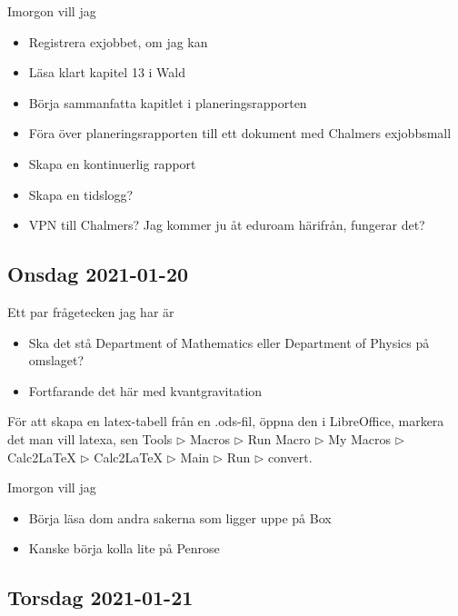 Imorgon vill jag
\begin{itemize}
	\item Registrera exjobbet, om jag kan
	\item Läsa klart kapitel 13 i Wald \checkmark
	\item Börja sammanfatta kapitlet i planeringsrapporten \checkmark
	\item Föra över planeringsrapporten till ett dokument med Chalmers exjobbsmall \checkmark
	\item Skapa en kontinuerlig rapport \checkmark
	\item Skapa en tidslogg?
	\item VPN till Chalmers? Jag kommer ju åt eduroam härifrån, fungerar det?
\end{itemize}


\subsection{Onsdag 2021-01-20}

Ett par frågetecken jag har är
\begin{itemize}
	\item Ska det stå Department of Mathematics eller Department of Physics på omslaget?
	\item Fortfarande det här med kvantgravitation
\end{itemize}


För att skapa en latex-tabell från en .ods-fil, öppna den i LibreOffice, markera det man vill latexa, sen Tools $\triangleright$ Macros $\triangleright$ Run Macro $\triangleright$ My Macros $\triangleright$ Calc2LaTeX $\triangleright$ Calc2LaTeX $\triangleright$ Main $\triangleright$ Run $\triangleright$ convert.

\bigskip

Imorgon vill jag
\begin{itemize}
	\item Börja läsa dom andra sakerna som ligger uppe på Box
	\item Kanske börja kolla lite på Penrose \cite{PenRinVol1,PenRinVol2}
\end{itemize}



\subsection{Torsdag 2021-01-21}

